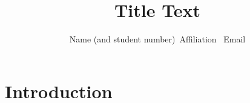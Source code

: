 \documentclass [11pt]{ article}
\begin{document}
\title{Title Text}
\author{Name (and student number)\ Affiliation \ Email}
\maketitle
\section{Introduction}


\end{document}
